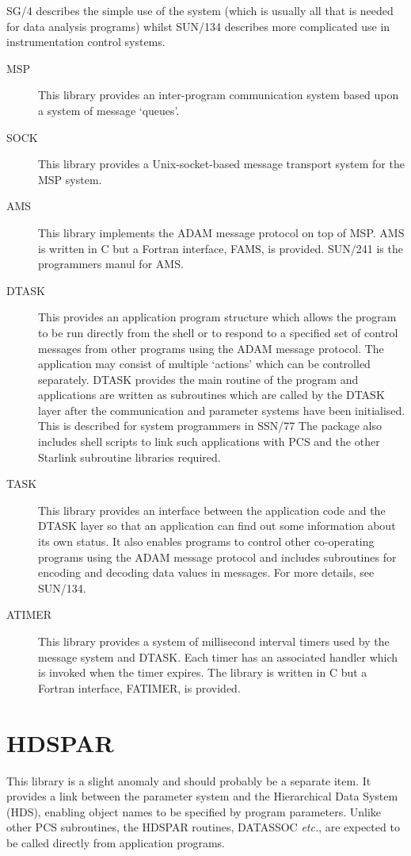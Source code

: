 \documentclass[twoside,11pt]{article}
\newcommand{\xref}[3]{#1}
\newcommand{\xlabel}[1]{}
\renewcommand{\_}{\texttt{\symbol{95}}}
\begin{document}
\xref{SG/4}{sg4}{}
describes the simple use of the system (which is usually all that is needed for
data analysis programs) whilst 
\xref{SUN/134}{sun134}{} 
describes more complicated use in instrumentation control systems.
\begin{description}
\item[MSP] This library provides an inter-program communication system based 
upon a system of message `queues'.
\item[SOCK] This library provides a Unix-socket-based message transport system 
for the MSP system.
\item[AMS] This library implements the ADAM message protocol on top of MSP.
AMS is written in C but a Fortran interface, FAMS, is provided.
\xref{SUN/241}{sun241}{}
is the programmers manul for AMS.
\item[DTASK] This provides an application program structure which allows the 
program to be run directly from the shell or to respond to a specified set of 
control messages from other programs using the ADAM message protocol.
The application may consist of multiple `actions' which can be controlled
separately.
DTASK provides the main routine of the program and applications are written 
as subroutines which are called by the DTASK layer after the communication and
parameter systems have been initialised. This is described for system
programmers in
\xref{SSN/77}{ssn77}{}
The package also includes shell scripts to link such applications with PCS and
the other Starlink subroutine libraries required.
\item[TASK] This library provides an interface between the application code
and the DTASK layer so that an application can find out some information
about its own status. It also enables programs to control other co-operating
programs using the ADAM message protocol and includes subroutines for encoding
and decoding data values in messages.
For more details, see 
\xref{SUN/134}{sun134}{}.
\item[ATIMER] This library provides a system of millisecond interval timers 
used by the message system and DTASK. 
Each timer has an associated handler which is invoked when the timer expires.
The library is written in C but a Fortran interface, FATIMER, is provided.
\end{description}

\section{\xlabel{hdspar}HDSPAR}
This library is a slight anomaly and should probably be a separate item.
It provides a link between the parameter system and the
\xref{Hierarchical Data System (HDS)}{sun92}{abstract},
enabling object names to be specified by program parameters.
Unlike other PCS subroutines, the HDSPAR routines, DAT\_ASSOC \textit{etc.}, are
expected to be called directly from application programs.
\end{document}
